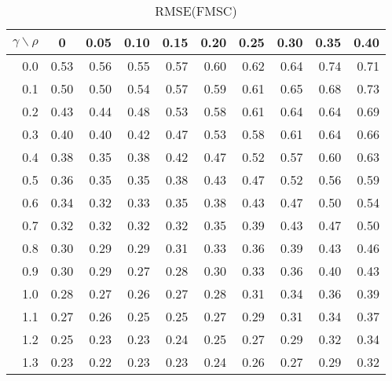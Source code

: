 \documentclass[12pt]{article}
\begin{document}
\begin{table}[!tbp]
\caption{RMSE(FMSC)}
 \begin{center}
 \begin{tabular}{r|rrrrrrrrr}\hline\hline
\multicolumn{1}{c|}{$\gamma\backslash\rho$}&\multicolumn{1}{c}{0}&\multicolumn{1}{c}{0.05}&\multicolumn{1}{c}{0.10}&\multicolumn{1}{c}{0.15}&\multicolumn{1}{c}{0.20}&\multicolumn{1}{c}{0.25}&\multicolumn{1}{c}{0.30}&\multicolumn{1}{c}{0.35}&\multicolumn{1}{c}{0.40}\tabularnewline
\hline


0.0&0.53&0.56&0.55&0.57&0.60&0.62&0.64&0.74&0.71\tabularnewline
0.1&0.50&0.50&0.54&0.57&0.59&0.61&0.65&0.68&0.73\tabularnewline
0.2&0.43&0.44&0.48&0.53&0.58&0.61&0.64&0.64&0.69\tabularnewline
0.3&0.40&0.40&0.42&0.47&0.53&0.58&0.61&0.64&0.66\tabularnewline
0.4&0.38&0.35&0.38&0.42&0.47&0.52&0.57&0.60&0.63\tabularnewline
0.5&0.36&0.35&0.35&0.38&0.43&0.47&0.52&0.56&0.59\tabularnewline
0.6&0.34&0.32&0.33&0.35&0.38&0.43&0.47&0.50&0.54\tabularnewline
0.7&0.32&0.32&0.32&0.32&0.35&0.39&0.43&0.47&0.50\tabularnewline
0.8&0.30&0.29&0.29&0.31&0.33&0.36&0.39&0.43&0.46\tabularnewline
0.9&0.30&0.29&0.27&0.28&0.30&0.33&0.36&0.40&0.43\tabularnewline
1.0&0.28&0.27&0.26&0.27&0.28&0.31&0.34&0.36&0.39\tabularnewline
1.1&0.27&0.26&0.25&0.25&0.27&0.29&0.31&0.34&0.37\tabularnewline
1.2&0.25&0.23&0.23&0.24&0.25&0.27&0.29&0.32&0.34\tabularnewline
1.3&0.23&0.22&0.23&0.23&0.24&0.26&0.27&0.29&0.32\tabularnewline
\hline
\end{tabular}

\end{center}

\end{table}

%
\end{document}
